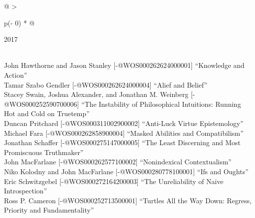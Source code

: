 \documentclass[
  10pt,
  letterpaper,
  DIV=11,
  numbers=noendperiod,
  twoside]{scrartcl}
\begin{document}
\begin{longtable}[]{@{}
  >{\raggedright\arraybackslash}p{(\columnwidth - 0\tabcolsep) * }@{}}

\caption{\label{tbl-top-ten-2008}Most cited articles published less than
ten years ago as of 2017.}

\tabularnewline

\toprule\noalign{}
\begin{minipage}[b]{\linewidth}\raggedright
2017
\end{minipage} \\
\midrule\noalign{}
\endhead
\bottomrule\noalign{}
\endlastfoot
John Hawthorne and Jason Stanley {[}-@WOS000262624000001{]} ``Knowledge
and Action'' \\
Tamar Szabo Gendler {[}-@WOS000262624000004{]} ``Alief and Belief'' \\
Stacey Swain, Joshua Alexander, and Jonathan M. Weinberg
{[}-@WOS000252590700006{]} ``The Instability of Philosophical
Intuitions: Running Hot and Cold on Truetemp'' \\
Duncan Pritchard {[}-@WOS000311002900002{]} ``Anti-Luck Virtue
Epistemology'' \\
Michael Fara {[}-@WOS000262858900004{]} ``Masked Abilities and
Compatibilism'' \\
Jonathan Schaffer {[}-@WOS000275147000005{]} ``The Least Discerning and
Most Promiscuous Truthmaker'' \\
John MacFarlane {[}-@WOS000262577100002{]} ``Nonindexical
Contextualism'' \\
Niko Kolodny and John MacFarlane {[}-@WOS000280778100001{]} ``Ifs and
Oughts'' \\
Eric Schwitzgebel {[}-@WOS000272164200003{]} ``The Unreliability of
Naive Introspection'' \\
Ross P. Cameron {[}-@WOS000252713500001{]} ``Turtles All the Way Down:
Regress, Priority and Fundamentality'' \\

\end{longtable}
\end{document}
